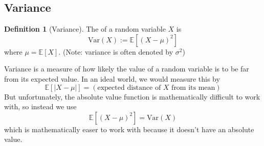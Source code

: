 \documentclass[10pt]{article}
\theoremstyle{definition}
\newtheorem{definition}[theorem]{Definition}
\newcommand{\1}[1]{\textbf{1}_{\left[#1\right]}} %
\def\E{\mathbb{E}} %
\newcommand{\dempfcolor}[1]{{\color{RoyalBlue}#1}}
\newcommand{\demph}[1]{\dempfcolor{{\sl \textbf{#1}}}}
\begin{document}

\subsection{Variance}
\begin{definition}[Variance]
  \label{def:variance}
  The \demph{variance} of a random variable $X$ is
  \begin{equation*}
    \text{Var}(X) := \E\left[(X-\mu)^{2} \right]
  \end{equation*}
  where $\mu= \E\left[X \right]$. (Note: variance is often denoted by $\sigma^{2}$)
\end{definition}

Variance is a measure of how likely the value of a random variable is to be far from its expected value.
In an ideal world, we would measure this by
\begin{equation*}
  \E\left[\left| X-\mu \right| \right] = (\text{expected distance of $X$ from its mean})
\end{equation*}
But unfortunately, the absolute value function is mathematically difficult to work with, so instead we
use
\begin{equation*}
  \E\left[(X-\mu)^{2} \right] = \text{Var}(X)
\end{equation*}
which is mathematically easer to work with because it doesn't have an absolute value.
\end{document}
